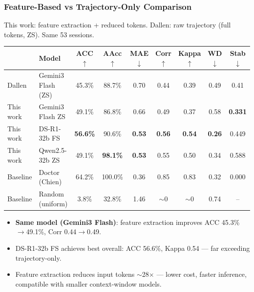 \documentclass[aspectratio=169]{beamer}
\begin{document}
\begin{frame}
    \frametitle{Feature-Based vs Trajectory-Only Comparison}
    \footnotesize{This work: feature extraction + reduced tokens. Dallen: raw trajectory (full tokens, ZS). Same 53 sessions.}
    \vspace{0.3em}
    {\footnotesize
    \setlength{\tabcolsep}{3.5pt}
    \begin{table}
        \centering
        \begin{tabular}{llccccccc}
        \toprule
        & \textbf{Model} & \textbf{ACC $\uparrow$} & \textbf{AAcc $\uparrow$} & \textbf{MAE $\downarrow$} & \textbf{Corr $\uparrow$} & \textbf{Kappa $\uparrow$} & \textbf{WD $\downarrow$} & \textbf{Stab $\downarrow$} \\
        \midrule
        Dallen & Gemini3 Flash (ZS) & 45.3\% & 88.7\% & 0.70 & 0.44 & 0.39 & 0.49 & 0.41 \\
        \midrule
        This work & Gemini3 Flash ZS & 49.1\% & 86.8\% & 0.66 & 0.49 & 0.37 & 0.58 & \cellcolor{green!15}\textbf{0.331} \\
        This work & DS-R1-32b FS & \cellcolor{green!15}\textbf{56.6\%} & 90.6\% & \cellcolor{green!15}\textbf{0.53} & \cellcolor{green!15}\textbf{0.56} & \cellcolor{green!15}\textbf{0.54} & \cellcolor{green!15}\textbf{0.26} & 0.449 \\
        This work & Qwen2.5-32b ZS & 49.1\% & \cellcolor{green!15}\textbf{98.1\%} & \cellcolor{green!15}\textbf{0.53} & 0.55 & 0.50 & 0.34 & 0.588 \\
        \midrule
        \rowcolor{yellow!12}
        Baseline & Doctor (Chien) & 64.2\% & 100.0\% & 0.36 & 0.85 & 0.83 & 0.32 & 0.000 \\
        \rowcolor{gray!12}
        Baseline & Random (uniform) & 3.8\% & 32.8\% & 1.46 & $\sim$0 & $\sim$0 & 0.74 & -- \\
        \bottomrule
        \end{tabular}
    \end{table}
    }
    \vspace{0.3em}
    \begin{itemize}\setlength{\itemsep}{2pt}
        \footnotesize
        \item \textbf{Same model (Gemini3 Flash)}: feature extraction improves ACC 45.3\%$\to$49.1\%, Corr 0.44$\to$0.49.
        \item DS-R1-32b FS achieves best overall: ACC 56.6\%, Kappa 0.54 --- far exceeding trajectory-only.
        \item Feature extraction reduces input tokens $\sim$28$\times$ --- lower cost, faster inference, compatible with smaller context-window models.
    \end{itemize}
\end{frame}
\end{document}
